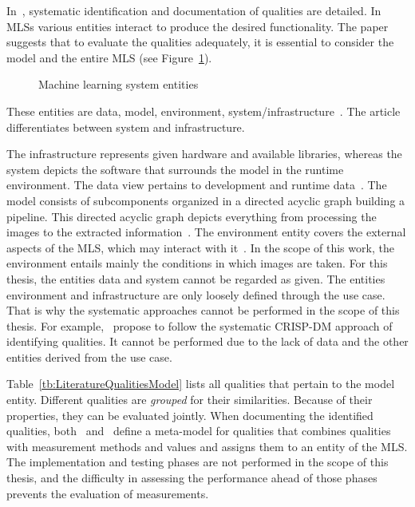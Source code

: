 In~\cite{nakamichi_requirements-driven_2020,siebert_construction_2021}, systematic
identification and documentation of qualities are detailed.
In \acp{MLS} various entities interact to produce the desired functionality.
The paper~\cite{nakamichi_requirements-driven_2020} suggests that to evaluate
the qualities adequately, it is essential to consider the model and the entire \ac{MLS}
(see Figure~\ref{fig:MLS}).
\begin{figure}[ht]
    \centering
    
    \caption[Machine learning system entities]{%
        Machine learning system entities~\citep{nakamichi_requirements-driven_2020}\label{fig:MLS}
    }
\end{figure}
These entities are data, model, environment,
system/infrastructure~\citep{nakamichi_requirements-driven_2020, siebert_construction_2021}.
The article~\cite{siebert_construction_2021} differentiates between system and infrastructure.

The infrastructure represents given hardware and available libraries, whereas the system depicts
the software that surrounds the model in the runtime environment.
The data view pertains to development and runtime data~\citep{siebert_construction_2021}.
The model consists of subcomponents organized in a directed acyclic graph building a
pipeline.
This directed acyclic graph depicts everything from processing the images to the extracted
information~\citep{siebert_construction_2021}.
The environment entity covers the external aspects of the \ac{MLS}, which may interact with
it~\citep{siebert_construction_2021}.
In the scope of this work, the environment entails mainly the conditions in which images are taken.
For this thesis, the entities data and system cannot be regarded as given.
The entities environment and infrastructure are only loosely defined through the use case.
That is why the systematic approaches cannot be performed in the scope of this thesis.
For example,~\cite{siebert_construction_2021} propose to follow the systematic CRISP-DM approach of
identifying qualities.
It cannot be performed due to the lack of data and the other entities derived from the use case.

Table~\ref{tb:LiteratureQualitiesModel} lists all qualities that pertain to the model entity.
Different qualities are \textit{grouped} for their similarities.
Because of their properties, they can be evaluated jointly.
When documenting the identified qualities,
both~\cite{nakamichi_requirements-driven_2020} and~\cite{siebert_construction_2021} define a
meta-model for qualities that combines qualities with
measurement methods and values and assigns them to an entity of the \ac{MLS}.
The implementation and testing phases are not performed in the scope of this thesis, and the
difficulty in assessing the performance ahead of those phases prevents the evaluation
of measurements.

